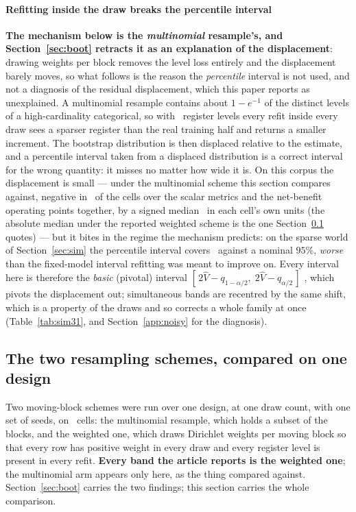 \paragraph{Refitting inside the draw breaks the percentile interval}
\textbf{The mechanism below is the \emph{multinomial} resample's, and
Section~\ref{sec:boot} retracts it as an explanation of the displacement}:
drawing weights per block removes the level loss entirely and the displacement
barely moves, so what follows is the reason the \emph{percentile} interval is
not used, and not a diagnosis of the residual displacement, which this paper
reports as unexplained. A multinomial resample contains about $1 - e^{-1}$ of
the distinct levels of a
high-cardinality categorical, so with \cardF\ register levels every refit
inside every draw sees a sparser register than the real training half and
returns a smaller increment. The bootstrap distribution is then displaced
relative to the estimate, and a percentile interval taken from a displaced
distribution is a correct interval for the wrong quantity: it misses no matter
how wide it is. On this corpus the displacement is small --- under the
multinomial scheme this section compares against, negative in
\shiftNegativePct\ of the cells over the scalar metrics and the
net-benefit operating points together, by a signed median \shiftMedian\ in
each cell's own units (the absolute median under the
reported weighted scheme is the one Section~\ref{app:schemes} quotes) ---
but it bites in
the regime the mechanism predicts: on the sparse world of
Section~\ref{sec:sim} the percentile interval covers \coverageSparsePct\
against a nominal $95\%$, \emph{worse} than the fixed-model interval refitting
was meant to improve on. Every interval here is therefore the \emph{basic}
(pivotal) interval
$[\,2\hat{V} - q_{1-\alpha/2},\; 2\hat{V} - q_{\alpha/2}\,]$
\citep{davison1997bootstrap}, which pivots the
displacement out; simultaneous bands are recentred by the same shift, which is
a property of the draws and so corrects a whole family at once
(Table~\ref{tab:sim31}, and Section~\ref{app:noisy} for the diagnosis).

\subsection{The two resampling schemes, compared on one design}
\label{app:schemes}

Two moving-block schemes were run over one design, at one draw count, with
one set of seeds, on \schemeCells\ cells: the multinomial resample, which
holds a subset of the blocks, and the weighted one, which draws Dirichlet
weights per moving block so that every row has positive weight in every draw
and every register level is present in every refit. \textbf{Every band the
article reports is the weighted one}; the multinomial arm appears only here,
as the thing compared against. Section~\ref{sec:boot} carries the two
findings; this section carries the whole comparison.

